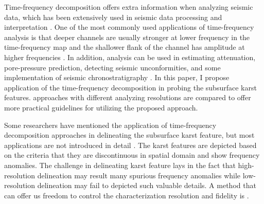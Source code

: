 Time-frequency decomposition offers extra information when analyzing seismic data, which has been extensively used in seismic data processing and interpretation \cite[]{jiajun2013,reine2009,rodriguez2012,fomel20132,tfpeak2015,yangkang2015sswt,liuwei20162,zhangdong20162}.
One of the most commonly used applications of time-frequency analysis is that deeper channels are usually  stronger  at lower frequency in the time-frequency map\new{,} and the shallower flank of the channel has  amplitude at higher frequencies  . In addition,  analysis can be used in estimating attenuation, pore-pressure prediction, detecting seismic unconformities, and some implementation of seismic chronostratigraphy .  In this paper, I  propose  application of the time-frequency decomposition in probing the subsurface karst features.    approaches with different analyzing resolutions are compared to offer more practical guidelines for utilizing the proposed approach. 

 Some researchers have mentioned the application of time-frequency decomposition approaches in delineating the subsurface karst feature, but most applications are not introduced in detail \cite[]{satinder2007,gaynor2010}. The karst features are depicted based on the criteria that they are discontinuous in spatial domain and show frequency anomalies. The challenge in delineating karst feature lays in the fact that high-resolution delineation may result  many spurious frequency anomalies while low-resolution delineation may fail to depicted such valuable details. A method that can offer us freedom to control the characterization resolution and fidelity is . 

